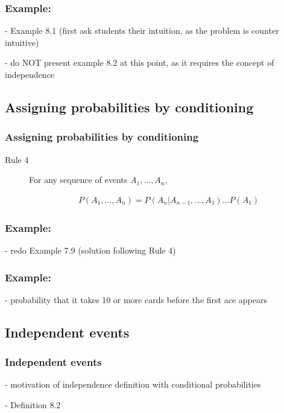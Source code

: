 \begin{frame}
    \frametitle{Example:}

- Example 8.1 (first ask students their intuition, as the problem is counter intuitive)

- do NOT present example 8.2 at this point, as it requires the concept of independence

\end{frame}

\subsection{Assigning probabilities by conditioning}

\begin{frame}
    \frametitle{Assigning probabilities by conditioning}

    \begin{description}

        \item[Rule 4] For any sequence of events $A_1,\ldots,A_n$,

            \begin{align*}
                P(A_1, ..., A_n) = P(A_n|A_{n-1}, ..., A_1) \ldots P(A_1)
            \end{align*}

    \end{description}

\end{frame}

\begin{frame}
    \frametitle{Example:}

    - redo Example 7.9 (solution following Rule 4)

\end{frame}

\begin{frame}
    \frametitle{Example:}

    - probability that it takes 10 or more cards before the first ace appears

\end{frame}

\subsection{Independent events}

\begin{frame}
    \frametitle{Independent events}

- motivation of independence definition with conditional probabilities

- Definition 8.2

\end{frame}


